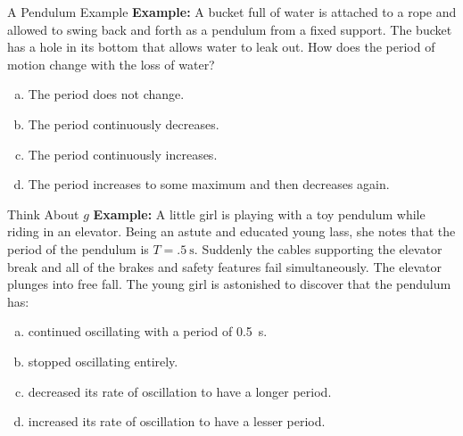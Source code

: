 \documentclass[12pt,compress,aspectratio=169]{beamer}
\begin{document}



\begin{frame}{A Pendulum Example}
  \textbf{Example:} A bucket full of water is attached to a rope and allowed
  to swing back and forth as a pendulum from a fixed support. The bucket has a
  hole in its bottom that allows water to leak out. How does the period of
  motion change with the loss of water?
  \begin{enumerate}[(a)]
  \item The period does not change.
  \item The period continuously decreases.
  \item The period continuously increases.
  \item The period increases to some maximum and then decreases again.
  \end{enumerate}
\end{frame}


\begin{frame}{Think About $g$}
  \textbf{Example:} A little girl is playing with a toy pendulum while riding
  in an elevator. Being an astute and educated young lass, she notes that the 
  period of the pendulum is $T=\SI{.5}{\second}$. Suddenly the cables
  supporting the elevator break and all  of the brakes and safety features fail
  simultaneously. The elevator plunges into free fall. The young girl is
  astonished to discover that the pendulum has:
  \begin{enumerate}[(a)]
  \item continued oscillating with a period of \SI{.5}{\second}.
  \item stopped oscillating entirely.
  \item decreased its rate of oscillation to have a longer period.
  \item increased its rate of oscillation to have a lesser period.
  \end{enumerate}
\end{frame}
\end{document}
